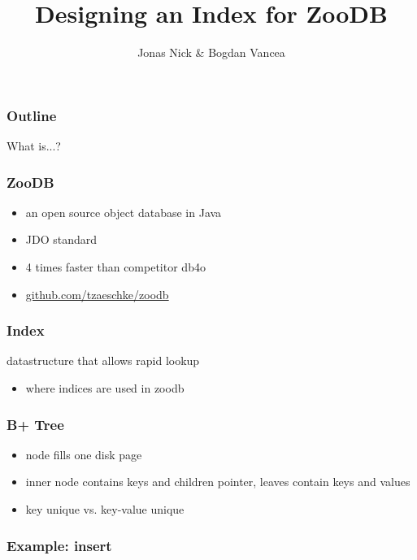 \documentclass{beamer}
\title{Designing an Index for ZooDB}
\author{Jonas Nick \& Bogdan Vancea}
\begin{document}
  \frame{\titlepage}
  \begin{frame}
    \frametitle{Outline}
    \tableofcontents[hideallsubsections]
  \end{frame}

  \begin{section}{What is...?}
    \begin{frame}
      \frametitle{ZooDB}
      \begin{itemize}
        \item an open source object database in Java
        \item JDO standard
        \item 4 times faster than competitor db4o
        \item \url{github.com/tzaeschke/zoodb}
      \end{itemize}

    \end{frame}
    \begin{frame}
      \frametitle{Index}
      \begin{block}{}
        datastructure that allows rapid lookup
      \end{block}
      \begin{itemize}
        \item where indices are used in zoodb
      \end{itemize}
    \end{frame}
    \begin{frame}
      \frametitle{B+ Tree}
      \begin{itemize}
        \item node fills one disk page
        \item inner node contains keys and children pointer, leaves contain keys and values
        \item key unique vs. key-value unique
      \end{itemize}
    \end{frame}
    \begin{frame}
      \frametitle{Example: insert}
    \end{frame}
  \end{section}
\end{document}

